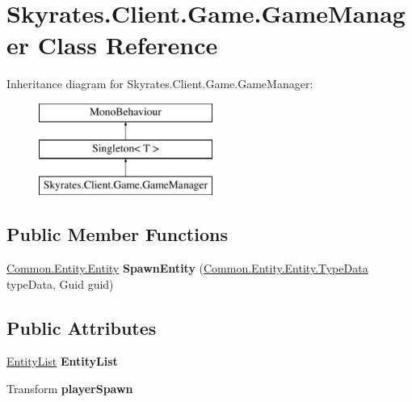 \hypertarget{class_skyrates_1_1_client_1_1_game_1_1_game_manager}{\section{Skyrates.\-Client.\-Game.\-Game\-Manager Class Reference}
\label{class_skyrates_1_1_client_1_1_game_1_1_game_manager}
}
Inheritance diagram for Skyrates.\-Client.\-Game.\-Game\-Manager\-:\begin{figure}[H]
\begin{center}
\leavevmode
\includegraphics[height=3.000000cm]{class_skyrates_1_1_client_1_1_game_1_1_game_manager}
\end{center}
\end{figure}
\subsection*{Public Member Functions}
\begin{DoxyCompactItemize}
\item 
\hypertarget{class_skyrates_1_1_client_1_1_game_1_1_game_manager_a893f619e6b00db10a0cc40ade9ffd325}{\hyperlink{class_skyrates_1_1_common_1_1_entity_1_1_entity}{Common.\-Entity.\-Entity} {\bfseries Spawn\-Entity} (\hyperlink{class_skyrates_1_1_common_1_1_entity_1_1_entity_1_1_type_data}{Common.\-Entity.\-Entity.\-Type\-Data} type\-Data, Guid guid)}\label{class_skyrates_1_1_client_1_1_game_1_1_game_manager_a893f619e6b00db10a0cc40ade9ffd325}

\end{DoxyCompactItemize}
\subsection*{Public Attributes}
\begin{DoxyCompactItemize}
\item 
\hypertarget{class_skyrates_1_1_client_1_1_game_1_1_game_manager_a6cd625a0d48f736b04afc3ec98e4ed53}{\hyperlink{class_skyrates_1_1_common_1_1_entity_1_1_entity_list}{Entity\-List} {\bfseries Entity\-List}}\label{class_skyrates_1_1_client_1_1_game_1_1_game_manager_a6cd625a0d48f736b04afc3ec98e4ed53}

\item 
\hypertarget{class_skyrates_1_1_client_1_1_game_1_1_game_manager_a39846b49f8069b0d99ce5622aac06ac8}{Transform {\bfseries player\-Spawn}}\label{class_skyrates_1_1_client_1_1_game_1_1_game_manager_a39846b49f8069b0d99ce5622aac06ac8}

\end{DoxyCompactItemize}
